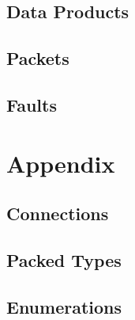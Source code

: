 \subsection{Data Products}



\subsection{Packets}



\subsection{Faults}



\section{Appendix}
\subsection{Connections}


\subsection{Packed Types}



\subsection{Enumerations}




